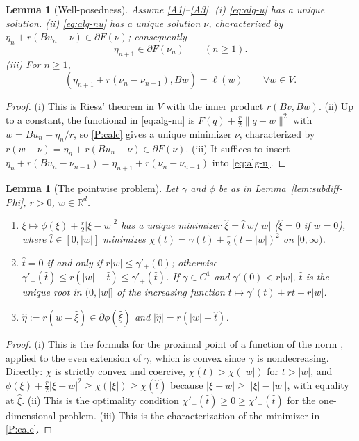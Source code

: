 \documentclass[11pt]{amsart}
\newtheorem{lemma}[theorem]{Lemma}
\theoremstyle{definition}
\theoremstyle{remark}
\numberwithin{equation}{section}
\newcommand{\R}{\mathbb{R}}
\newcommand{\abs}[1]{\lvert #1\rvert}
\newcommand{\norm}[1]{\lVert #1\rVert}
\begin{document}
\begin{lemma}[Well-posedness]\label{lem:wellposed}
Assume \ref{A1}--\ref{A3}. \textup{(i)} \eqref{eq:alg-u} has a unique solution. \textup{(ii)} \eqref{eq:alg-nu} has a unique solution $\nu$, characterized by $\eta_n+r(Bu_n-\nu)\in\partial F(\nu)$; consequently
\begin{equation}\label{eq:eta-in-dF}
\eta_{n+1}\in\partial F(\nu_n)\qquad(n\ge1).
\end{equation}
\textup{(iii)} For $n\ge1$,
\begin{equation}\label{eq:alg-u2}
(\eta_{n+1}+r(\nu_n-\nu_{n-1}),Bw)=\ell(w)\qquad\forall w\in V .
\end{equation}
\end{lemma}
\begin{proof}
(i) This is Riesz' theorem in $V$ with the inner product $r(Bv,Bw)$. (ii) Up to a constant, the functional in \eqref{eq:alg-nu} is $F(q)+\frac r2\norm{q-w}^2$ with $w=Bu_n+\eta_n/r$, so \ref{P:calc} gives a unique minimizer $\nu$, characterized by $r(w-\nu)=\eta_n+r(Bu_n-\nu)\in\partial F(\nu)$. (iii) It suffices to insert $\eta_n+r(Bu_n-\nu_{n-1})=\eta_{n+1}+r(\nu_n-\nu_{n-1})$ into \eqref{eq:alg-u}.
\end{proof}

\begin{lemma}[The pointwise problem]\label{lem:pointwise-prox}
Let $\gamma$ and $\phi$ be as in Lemma~\ref{lem:subdiff-Phi}, $r>0$, $w\in\R^d$.
\begin{enumerate}[label=\textup{(\roman*)}]
\item $\xi\mapsto\phi(\xi)+\frac r2\abs{\xi-w}^2$ has a unique minimizer $\hat\xi=\hat t\,w/\abs w$ \textup($\hat\xi=0$ if $w=0$\textup), where $\hat t\in[0,\abs w]$ minimizes $\chi(t)=\gamma(t)+\frac r2(t-\abs w)^2$ on $[0,\infty)$.
\item $\hat t=0$ if and only if $r\abs w\le\gamma'_+(0)$; otherwise $\gamma'_-(\hat t)\le r(\abs w-\hat t)\le\gamma'_+(\hat t)$. If $\gamma\in C^1$ and $\gamma'(0)<r\abs w$, $\hat t$ is the unique root in $(0,\abs w]$ of the increasing function $t\mapsto\gamma'(t)+rt-r\abs w$.
\item $\hat\eta:=r(w-\hat\xi)\in\partial\phi(\hat\xi)$ and $\abs{\hat\eta}=r(\abs w-\hat t)$.
\end{enumerate}
\end{lemma}
\begin{proof}
(i) This is the formula for the proximal point of a function of the norm \cite[Ch.~24]{BauschkeCombettes2017}, %
applied to the even extension of $\gamma$, which is convex since $\gamma$ is nondecreasing. Directly: $\chi$ is strictly convex and coercive, $\chi(t)>\chi(\abs w)$ for $t>\abs w$, and $\phi(\xi)+\frac r2\abs{\xi-w}^2\ge\chi(\abs\xi)\ge\chi(\hat t)$ because $\abs{\xi-w}\ge\abs{\abs\xi-\abs w}$, with equality at $\hat\xi$. (ii) This is the optimality condition $\chi'_+(\hat t)\ge0\ge\chi'_-(\hat t)$ for the one-dimensional problem. (iii) This is the characterization of the minimizer in \ref{P:calc}.
\end{proof}
\end{document}
